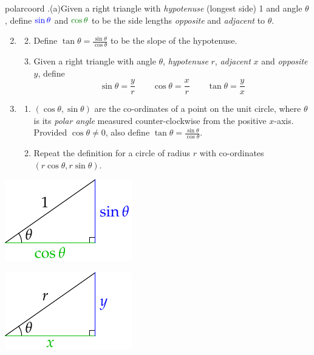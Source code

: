 \begin{defn}[lower separated=false, sidebyside, sidebyside align=top seam, sidebyside gap=0pt, righthand width=0.28\linewidth]{}{polarcoord}
	\hangindent{}.\lstsp(a)\lstsp Given a right triangle with \emph{hypotenuse} (longest side) 1 and angle $\theta$, define $\textcolor{blue}{\sin\theta}$ and $\textcolor{Green}{\cos\theta}$ to be the side lengths \emph{opposite} and \emph{adjacent} to $\theta$.\vspace{-5pt}
	\begin{enumerate}\setcounter{enumi}{1} 
	  \item[]
	  \begin{enumerate}\setcounter{enumii}{1}
	    \item[] Define $\tan\theta=\frac{\sin\theta}{\cos\theta}$ to be the slope of the hypotenuse.
	    \item Given a right triangle with angle $\theta$, \emph{hypotenuse} $r$, \emph{adjacent} $x$ and \emph{opposite} $y$, define
			\[
				\sin\theta=\frac yr\qquad \cos\theta=\frac xr\qquad \tan\theta=\frac yx
			\]
	  \end{enumerate}\vspace{-8pt}
	  \item\begin{enumerate}
	    \item $(\cos\theta,\sin\theta)$ are the co-ordinates of a point on the unit circle, where $\theta$ is its \emph{polar angle} measured counter-clockwise from the positive $x$-axis. Provided $\cos\theta\neq 0$, also define $\tan\theta=\frac{\sin\theta}{\cos\theta}$.
	    \item Repeat the definition for a circle of radius $r$ with co-ordinates $(r\cos\theta,r\sin\theta)$.
	  \end{enumerate}
	\end{enumerate}
	\tcblower
	\flushright
	\includegraphics{defn-trig1}\par
	\includegraphics{defn-trig2}\par

\end{defn}
